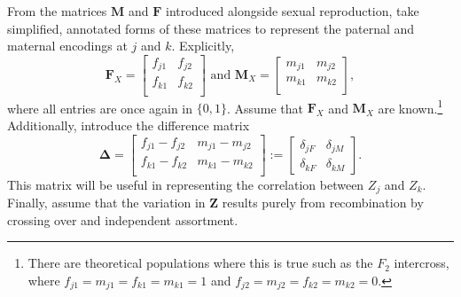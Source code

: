 \documentclass[12pt]{article}
\newcommand{\ve}[1]{\mathbf{#1}}           %
\newcommand{\m}[1]{\mathbf{#1}}               %
\newcommand{\sm}[1]{\boldsymbol{#1}}   %
\begin{document}
From the matrices $\m{M}$ and $\m{F}$ introduced alongside sexual reproduction, take simplified, annotated forms of these matrices to represent the paternal and maternal encodings at $j$ and $k$. Explicitly,
\begin{equation} \label{eq:parEncs}
  \m{F}_X = \begin{bmatrix}
  f_{j1} & f_{j2} \\
  f_{k1} & f_{k2} \\
\end{bmatrix} \text{ and }
\m{M}_X = \begin{bmatrix}
  m_{j1} & m_{j2} \\
  m_{k1} & m_{k2} \\
\end{bmatrix},
\end{equation}
where all entries are once again in $\{0,1\}$. Assume that $\m{F}_X$ and $\m{M}_X$ are known.\footnote{There are theoretical populations where this is true such as the $F_2$ intercross, where $f_{j1} = m_{j1} = f_{k1} = m_{k1} = 1$ and $f_{j2} = m_{j2} = f_{k2} = m_{k2} = 0$.} Additionally, introduce the difference matrix
\begin{equation} \label{eq:diffMatrix}
  \sm{\Delta} = \begin{bmatrix}
    f_{j1} - f_{j2} & m_{j1} - m_{j2} \\
    f_{k1} - f_{k2} & m_{k1} - m_{k2} \\
  \end{bmatrix} := \begin{bmatrix}
    \delta_{jF} & \delta_{jM} \\
    \delta_{kF} & \delta_{kM}
  \end{bmatrix}.
\end{equation}
This matrix will be useful in representing the correlation between $Z_j$ and $Z_k$.
Finally, assume that the variation in $\ve{Z}$ results purely from recombination by crossing over and independent assortment.
\end{document}
